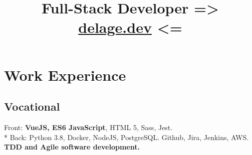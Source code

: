 \documentclass[11pt,a4paper,sans]{moderncv}
\title{Full-Stack Developer => \href{https://delage.dev/} {delage.dev} <=}
\begin{document}
\makecvtitle
\vspace{-2.5em}

\section{Work Experience}
\subsection{Vocational}

{{ Front: \textbf{VueJS, ES6 JavaScript}, HTML 5, Sass, Jest.  \\* 
Back: Python 3.8, Docker, NodeJS, PostgreSQL. Github, Jira, Jenkins, AWS. \textbf{TDD and Agile software development.}} \href{https://www.deepreach.com/} {}}
\end{document}
